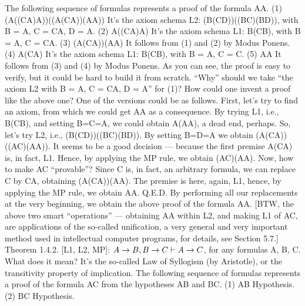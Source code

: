 The following sequence of formulas represents a proof of the formula A\IMPLIES A.
(1) (A\IMPLIES ((C\IMPLIES A)\IMPLIES A))\IMPLIES ((A\IMPLIES (C\IMPLIES A))\IMPLIES (A\IMPLIES A)) It's the axiom schema L2: (B\IMPLIES (C\IMPLIES D))\IMPLIES ((B\IMPLIES C)\IMPLIES (B\IMPLIES D)), with B = A, C = C\IMPLIES A, D = A.  (2) A\IMPLIES ((C\IMPLIES A)\IMPLIES A) It's the axiom schema L1: B\IMPLIES (C\IMPLIES B), with B = A, C = C\IMPLIES A.  (3) (A\IMPLIES (C\IMPLIES A))\IMPLIES (A\IMPLIES A) It follows from (1) and (2) by Modus Ponens.  (4) A\IMPLIES (C\IMPLIES A) It's the axiom schema L1: B\IMPLIES (C\IMPLIES B), with B = A, C = C.  (5) A\IMPLIES A It follows from (3) and (4) by Modus Ponens.
As you can see, the proof is easy to verify, but it could be hard to build it from scratch. ``Why'' should we
take ``the axiom L2 with B = A, C = C\IMPLIES A, D = A'' for (1)?
How could one invent a proof like the above one? One of the versions could be as follows. First, let's try to find an axiom,
from which we could get A\IMPLIES A as a consequence. By trying L1, i.e., B\IMPLIES (C\IMPLIES B), and setting B=C=A, we could obtain
A\IMPLIES (A\IMPLIES A), a dead end, perhaps. So, let's try L2, i.e., (B\IMPLIES (C\IMPLIES D))\IMPLIES ((B\IMPLIES C)\IMPLIES (B\IMPLIES D)). By setting B=D=A we obtain
(A\IMPLIES (C\IMPLIES A))\IMPLIES ((A\IMPLIES C)\IMPLIES (A\IMPLIES A)). It seems to be a good decision --- because the first premise A\IMPLIES (C\IMPLIES A) is, in fact, L1.
Hence, by applying the MP rule, we obtain (A\IMPLIES C)\IMPLIES (A\IMPLIES A). Now, how to make A\IMPLIES C ``provable''? Since C is, in fact, an
arbitrary formula, we can replace C by C\IMPLIES A, obtaining (A\IMPLIES (C\IMPLIES A))\IMPLIES (A\IMPLIES A). The premise is here, again, L1, hence, by
applying the MP rule, we obtain A\IMPLIES A. Q.E.D. By performing all our replacements at the very beginning, we obtain the above
proof of the formula A\IMPLIES A. [BTW, the above two smart ``operations'' --- obtaining A\IMPLIES A within L2, and making L1 of A\IMPLIES C,
are applications of the so-called unification, a very general and very important method used in intellectual computer programs,
for details, see Section 5.7.]
Theorem 1.4.2. [L1, L2, MP]: \(A\rightarrow B, B\rightarrow C \vdash A\rightarrow C\), for any formulas A, B, C. What does it mean? It's
the so-called Law of Syllogism (by Aristotle), or the transitivity property of implication.
The following sequence of formulas represents a proof of the formula A\IMPLIES C from the hypotheses A\IMPLIES B
and B\IMPLIES C.
(1) A\IMPLIES B
Hypothesis.
(2) B\IMPLIES C Hypothesis.
